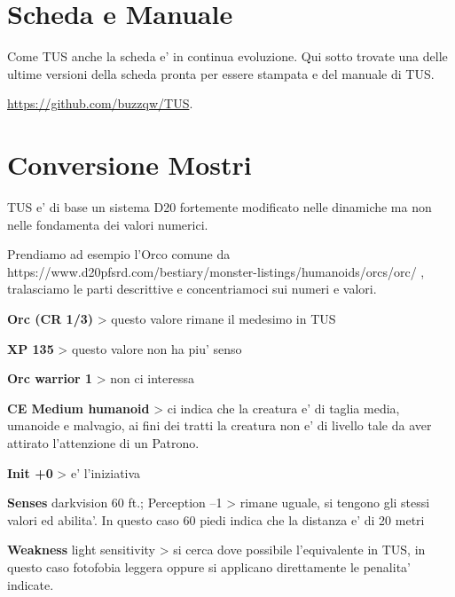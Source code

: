 \documentclass[a4paper,11pt,twoside,openany]{book}
\begin{document}
{\pagebreak

\section{Scheda e Manuale}

\label{scheda-e-manuale}

Come TUS anche la scheda e' in continua evoluzione. Qui sotto trovate una delle ultime versioni della scheda pronta per essere stampata e del manuale di TUS. 

\url{https://github.com/buzzqw/TUS}.





\pagebreak

\section*{Conversione Mostri}

\bigskip

TUS e' di base un sistema D20 fortemente modificato nelle dinamiche ma non nelle fondamenta dei valori numerici.

Prendiamo ad esempio l'Orco comune da https://www.d20pfsrd.com/bestiary/monster-listings/humanoids/orcs/orc/ , tralasciamo le parti descrittive e concentriamoci sui numeri e valori.

\bigskip

\textbf{Orc (CR 1/3)} \textgreater{} questo valore rimane il medesimo in TUS

\textbf{XP 135} \textgreater{} questo valore non ha piu' senso 

\textbf{Orc warrior 1} \textgreater{} non ci interessa

\textbf{CE Medium humanoid} \textgreater{} ci indica che la creatura e' di taglia media, umanoide e malvagio, ai fini dei tratti la creatura non e' di livello tale da aver attirato l'attenzione di un Patrono.

\textbf{Init +0} \textgreater{} e' l'iniziativa

\textbf{Senses} darkvision 60 ft.; Perception --1 \textgreater{} rimane uguale, si tengono gli stessi valori ed abilita'. In questo caso 60 piedi indica che la distanza e' di 20 metri

\textbf{Weakness} light sensitivity \textgreater{} si cerca dove possibile l'equivalente in TUS, in questo caso fotofobia leggera oppure si applicano direttamente le penalita' indicate.

}
\end{document}
